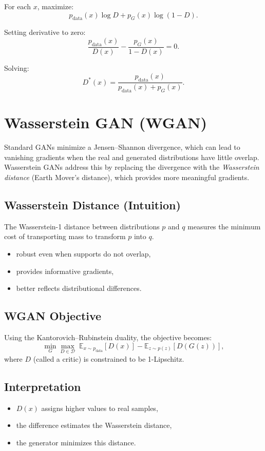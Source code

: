For each $x$, maximize:
\[
p_{\text{data}}(x)\log D + p_G(x)\log(1-D).
\]

Setting derivative to zero:
\[
\frac{p_{\text{data}}(x)}{D(x)} - \frac{p_G(x)}{1-D(x)} = 0.
\]

Solving:
\[
D^*(x)=\frac{p_{\text{data}}(x)}{p_{\text{data}}(x)+p_G(x)}.
\]

\section{Wasserstein GAN (WGAN)}

Standard GANs minimize a Jensen--Shannon divergence, which can lead to vanishing gradients when the real and generated distributions have little overlap. Wasserstein GANs address this by replacing the divergence with the \emph{Wasserstein distance} (Earth Mover's distance), which provides more meaningful gradients.

\subsection{Wasserstein Distance (Intuition)}

The Wasserstein-1 distance between distributions $p$ and $q$ measures the minimum cost of transporting mass to transform $p$ into $q$.

\begin{itemize}
    \item robust even when supports do not overlap,
    \item provides informative gradients,
    \item better reflects distributional differences.
\end{itemize}

\subsection{WGAN Objective}

Using the Kantorovich--Rubinstein duality, the objective becomes:
\[
\min_G \max_{D \in \mathcal{D}}
\;
\mathbb{E}_{x \sim p_{\text{data}}}[D(x)]
-
\mathbb{E}_{z \sim p(z)}[D(G(z))],
\]
where $D$ (called a critic) is constrained to be 1-Lipschitz.

\subsection{Interpretation}

\begin{itemize}
    \item $D(x)$ assigns higher values to real samples,
    \item the difference estimates the Wasserstein distance,
    \item the generator minimizes this distance.
\end{itemize}

